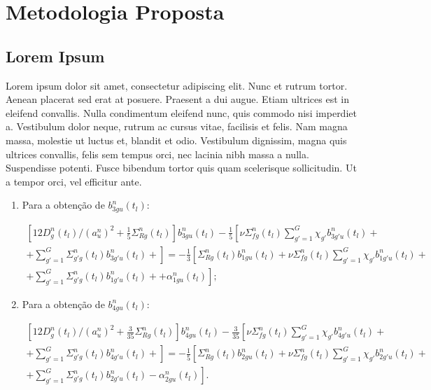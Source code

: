 \chapter{Metodologia Proposta}
\label{chap3}

\section{Lorem Ipsum}

Lorem ipsum dolor sit amet, consectetur adipiscing elit. Nunc et rutrum tortor. Aenean placerat sed erat at posuere. Praesent a dui augue. Etiam ultrices est in eleifend convallis. Nulla condimentum eleifend nunc, quis commodo nisi imperdiet a. Vestibulum dolor neque, rutrum ac cursus vitae, facilisis et felis. Nam magna massa, molestie ut luctus et, blandit et odio. Vestibulum dignissim, magna quis ultrices convallis, felis sem tempus orci, nec lacinia nibh massa a nulla. Suspendisse potenti. Fusce bibendum tortor quis quam scelerisque sollicitudin. Ut a tempor orci, vel efficitur ante.

\begin{enumerate}
    \item Para a obtenção de $b_{3gu}^n(t_l)$:
    
    \begin{equation}
    \begin{split}
        \left[12D_g^n(t_l)/(a_u^n)^2 + \frac{1}{5}\Sigma_{Rg}^n(t_l)\right]b_{3gu}^n(t_l) - \frac{1}{5}\left[\nu\Sigma_{fg}^n(t_l)\sum_{g'=1}^G\chi_{g'}b_{3g'u}^n(t_l)\right. + \\
        + \left.\sum_{g'=1}^G \Sigma_{g'g}^n(t_l)b_{3g'u}^n(t_l) + \right] = -\frac{1}{3}\left[\Sigma_{Rg}^n(t_l)b_{1gu}^n(t_l) + \nu\Sigma_{fg}^n(t_l)\sum_{g'=1}^G\chi_{g'}b_{1g'u}^n(t_l)\right. + \\
        \left.+\sum_{g'=1}^G\Sigma_{g'g}^n(t_l)b_{1g'u}^n(t_l)+  +\alpha_{1gu}^n(t_l)\right];
    \label{chap3:58}
    \end{split}
    \end{equation}
    
    \item Para a obtenção de $b_{4gu}^n(t_l)$:
    
    \begin{equation}
    \begin{split}
        \left[12D_g^n(t_l)/(a_u^n)^2 + \frac{3}{35}\Sigma_{Rg}^n(t_l)\right]b_{4gu}^n(t_l) - \frac{3}{35}\left[\nu\Sigma_{fg}^n(t_l)\sum_{g'=1}^G\chi_{g'}b_{4g'u}^n(t_l)\right. + \\
        \left.+ \sum_{g'=1}^G \Sigma_{g'g}^n(t_l)b_{4g'u}^n(t_l) + \right] = -\frac{1}{5}\left[\Sigma_{Rg}^n(t_l)b_{2gu}^n(t_l) + \nu\Sigma_{fg}^n(t_l)\sum_{g'=1}^G\chi_{g'}b_{2g'u}^n(t_l) \right. + \\
        +\left.\sum_{g'=1}^G\Sigma_{g'g}^n(t_l)b_{2g'u}^n(t_l)-\alpha_{2gu}^n(t_l) \right].
    \label{chap3:59}
    \end{split}        
    \end{equation}    
    
    
\end{enumerate}

